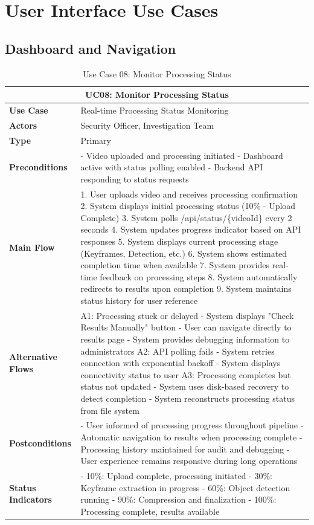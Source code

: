 \documentclass{article}
\begin{document}
\section{User Interface Use Cases}

\subsection{Dashboard and Navigation}

\begin{table}[H]
\centering
\begin{tabularx}{\textwidth}{|l|X|}
\hline
\multicolumn{2}{|c|}{\textbf{UC08: Monitor Processing Status}} \\ \hline
\textbf{Use Case} & Real-time Processing Status Monitoring \\ \hline
\textbf{Actors} & Security Officer, Investigation Team \\ \hline
\textbf{Type} & Primary \\ \hline
\textbf{Preconditions} & 
- Video uploaded and processing initiated
- Dashboard active with status polling enabled
- Backend API responding to status requests \\ \hline
\textbf{Main Flow} & 
1. User uploads video and receives processing confirmation
2. System displays initial processing status (10\% - Upload Complete)
3. System polls /api/status/\{videoId\} every 2 seconds
4. System updates progress indicator based on API responses
5. System displays current processing stage (Keyframes, Detection, etc.)
6. System shows estimated completion time when available
7. System provides real-time feedback on processing steps
8. System automatically redirects to results upon completion
9. System maintains status history for user reference \\ \hline
\textbf{Alternative Flows} & 
A1: Processing stuck or delayed
- System displays "Check Results Manually" button
- User can navigate directly to results page
- System provides debugging information to administrators
A2: API polling fails
- System retries connection with exponential backoff
- System displays connectivity status to user
A3: Processing completes but status not updated
- System uses disk-based recovery to detect completion
- System reconstructs processing status from file system \\ \hline
\textbf{Postconditions} & 
- User informed of processing progress throughout pipeline
- Automatic navigation to results when processing complete
- Processing history maintained for audit and debugging
- User experience remains responsive during long operations \\ \hline
\textbf{Status Indicators} & 
- 10\%: Upload complete, processing initiated
- 30\%: Keyframe extraction in progress
- 60\%: Object detection running
- 90\%: Compression and finalization
- 100\%: Processing complete, results available \\ \hline
\end{tabularx}
\caption{Use Case 08: Monitor Processing Status}
\end{table}
\end{document}
